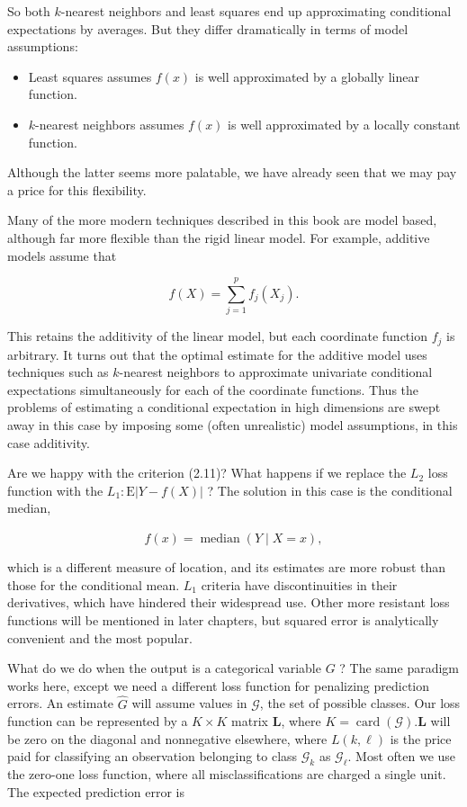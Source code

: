 \documentclass[10pt]{article}
\begin{document}
So both $k$-nearest neighbors and least squares end up approximating conditional expectations by averages. But they differ dramatically in terms of model assumptions:

\begin{itemize}
  \item Least squares assumes $f(x)$ is well approximated by a globally linear function.
  \item $k$-nearest neighbors assumes $f(x)$ is well approximated by a locally constant function.
\end{itemize}

Although the latter seems more palatable, we have already seen that we may pay a price for this flexibility.

Many of the more modern techniques described in this book are model based, although far more flexible than the rigid linear model. For example, additive models assume that


\begin{equation*}
f(X)=\sum_{j=1}^{p} f_{j}\left(X_{j}\right) . \tag{2.17}
\end{equation*}


This retains the additivity of the linear model, but each coordinate function $f_{j}$ is arbitrary. It turns out that the optimal estimate for the additive model uses techniques such as $k$-nearest neighbors to approximate univariate conditional expectations simultaneously for each of the coordinate functions. Thus the problems of estimating a conditional expectation in high dimensions are swept away in this case by imposing some (often unrealistic) model assumptions, in this case additivity.

Are we happy with the criterion (2.11)? What happens if we replace the $L_{2}$ loss function with the $L_{1}: \mathrm{E}|Y-f(X)|$ ? The solution in this case is the conditional median,


\begin{equation*}
\hat{f}(x)=\operatorname{median}(Y \mid X=x), \tag{2.18}
\end{equation*}


which is a different measure of location, and its estimates are more robust than those for the conditional mean. $L_{1}$ criteria have discontinuities in their derivatives, which have hindered their widespread use. Other more resistant loss functions will be mentioned in later chapters, but squared error is analytically convenient and the most popular.

What do we do when the output is a categorical variable $G$ ? The same paradigm works here, except we need a different loss function for penalizing prediction errors. An estimate $\hat{G}$ will assume values in $\mathcal{G}$, the set of possible classes. Our loss function can be represented by a $K \times K$ matrix $\mathbf{L}$, where $K=\operatorname{card}(\mathcal{G}) . \mathbf{L}$ will be zero on the diagonal and nonnegative elsewhere, where $L(k, \ell)$ is the price paid for classifying an observation belonging to class $\mathcal{G}_{k}$ as $\mathcal{G}_{\ell}$. Most often we use the zero-one loss function, where all misclassifications are charged a single unit. The expected prediction error is
\end{document}
